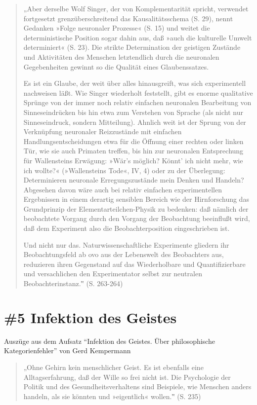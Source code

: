 \documentclass[
  a4paper,
]{report}
\begin{document}
\begin{quote}
„Aber derselbe Wolf Singer, der von Komplementarität spricht, verwendet fortgesetzt grenzüberschreitend das Kausalitätsschema (S. 29), nennt Gedanken »Folge neuronaler Prozesse« (S. 15) und weitet die deterministische Position sogar dahin aus, daß »auch die kulturelle Umwelt determiniert« (S. 23). Die strikte Determination der geistigen Zustände und Aktivitäten des Menschen letztendlich durch die neuronalen Gegebenheiten gewinnt so die Qualität eines Glaubenssatzes.

Es ist ein Glaube, der weit über alles hinausgreift, was sich experimentell nachweisen läßt. Wie Singer wiederholt feststellt, gibt es enorme qualitative Sprünge von der immer noch relativ einfachen neuronalen Bearbeitung von Sinneseindrücken bis hin etwa zum Verstehen von Sprache (als nicht nur Sinneseindruck, sondern Mitteilung). Ahnlich weit ist der Sprung von der Verknüpfung neuronaler Reizzustände mit einfachen Handlungsentscheidungen etwa für die Öffnung einer rechten oder linken Tür, wie sie auch Primaten treffen, bis hin zur neuronalen Entsprechung für Wallensteins Erwägung: »Wär's möglich? Könnt' ich nicht mehr, wie ich wollte?« (»Wallensteins Tode«, IV, 4) oder zu der Überlegung: Determinieren neuronale Erregungszustände mein Denken und Handeln? Abgesehen davon wäre auch bei relativ einfachen experimentellen Ergebnissen in einem derartig sensiblen Bereich wie der Hirnforschung das Grundprinzip der Elementarteilchen-Physik zu bedenken: daß nämlich der beobachtete Vorgang durch den Vorgang der Beobachtung beeinflußt wird, daß dem Experiment also die Beobachterposition eingeschrieben ist.

Und nicht nur das. Naturwissenschaftliche Experimente gliedern ihr Beobachtungsfeld ab ovo aus der Lebenswelt des Beobachters aus, reduzieren ihren Gegenstand auf das Wiederholbare und Quantifizierbare und versachlichen den Experimentator selbst zur neutralen Beobachterinstanz.‟ (S. 263-264)
\end{quote}

\hypertarget{pr-ev5}{%
\section{\#5 Infektion des Geistes}\label{pr-ev5}}

Auszüge aus dem Aufsatz ``Infektion des Geistes. Über philosophische Kategorienfehler'' von Gerd Kempermann \citeyearpar{Kempermann2004}

\begin{quote}
„Ohne Gehirn kein menschlicher Geist. Es ist ebenfalls eine Alltagserfahrung, daß der Wille so frei nicht ist. Die Psychologie der Politik und des Gesundheitsverhaltens sind Beispiele, wie Menschen anders handeln, als sie könnten und »eigentlich« wollen.‟ (S. 235)
\end{quote}
\end{document}
